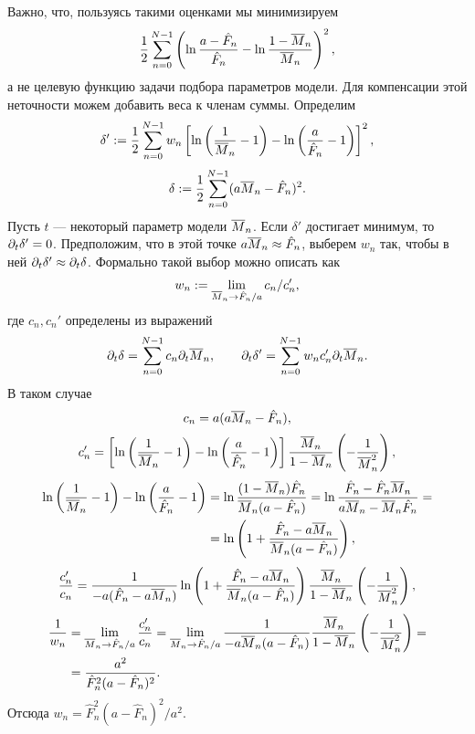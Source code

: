 Важно, что, пользуясь такими оценками мы минимизируем
\[
  \frac{1}{2}\sum_{n=0}^{N-1}\left(\ln \frac{a-\hat F_{n}}{\hat F_{n}}-
  \ln\frac{1-\overline{M}_{n}}{\overline{M}_{n}}
  \right)^{2},
\]
а не целевую функцию задачи подбора параметров модели. Для компенсации этой
неточности можем добавить веса к членам суммы. Определим
\[
  \delta':=\frac{1}{2}\sum_{n=0}^{N-1}w_{n}
  \left[
    \ln \left(\frac{1}{\overline{M}_{n}}-1\right)-
    \ln \left(\frac{a}{\hat F_{n}}-1\right)
    \right]^{2},
\]
\[
  \delta:=\frac{1}{2}\sum_{n=0}^{N-1}(a\overline{M}_{n}-\hat F_{n})^{2}.
\]
Пусть $t$ --- некоторый параметр модели $\overline{M}_{n}$. Если $\delta'$ достигает
минимум, то $\partial_{t}\delta'=0$. Предположим, что в этой точке
$a\overline{M}_{n}\approx\hat F_{n}$, выберем $w_{n}$ так, чтобы в ней
$\partial_{t}\delta'\approx\partial_{t}\delta$. Формально такой выбор можно описать как
\[
  w_{n}:=\lim_{\overline{M}_{n}\to \hat F_{n}/a}c_{n}/c'_{n},
\]
где $c_{n},c_{n}'$ определены из выражений
\[
  \partial_{t}\delta = \sum_{n=0}^{N-1}c_{n}\partial_{t}\overline{M}_{n},\qquad
  \partial_{t}\delta' = \sum_{n=0}^{N-1}w_{n}c'_{n}\partial_{t}\overline{M}_{n}.
\]
В таком случае
\[
  c_{n}=a(a\overline{M}_{n}-\hat F_{n}),
\]
\[
  c'_{n}=\left[
    \ln \left(\frac{1}{\overline{M}_{n}}-1\right)-
    \ln \left(\frac{a}{\hat F_{n}}-1\right)
    \right]\frac{\overline{M}_{n}}{1-\overline{M}_{n}}\left(-\frac{1}{\overline{M}_{n}^{2}}\right),
\]
\[
  \begin{aligned}
    \ln \left(\frac{1}{\overline{M}_{n}}-1\right)-
    \ln \left(\frac{a}{\hat F_{n}}-1\right)
     & =
    \ln
    \frac{(1-\overline{M}_{n})\hat F_{n}}{\overline{M}_{n}(a-\hat F_{n})}=
    \ln\frac{\hat F_{n}-\hat F_{n}\overline{M}_{n}}{a\overline{M}_{n}-\overline{M}_{n}\hat F_{n}}=  \\
     & =\ln\left(1+\frac{\hat F_{n}-a\overline{M}_{n}}{\overline{M}_{n}(a-\hat F_{n})}\right),
  \end{aligned}
\]
\[
  \frac{c'_{n}}{c_{n}}=\frac{1}{-a(\hat F_{n}-a\overline{M}_{n})}
  \ln\left(1+\frac{\hat F_{n}-a\overline{M}_{n}}{\overline{M}_{n}(a-\hat F_{n})}\right)
  \frac{\overline{M}_{n}}{1-\overline{M}_{n}}\left(-\frac{1}{\overline{M}_{n}^{2}}\right),
\]
\[
  \begin{aligned}
    \frac{1}{w_{n}}
     & =\lim_{\overline{M}_{n}\to\hat F_{n}/a}\frac{c'_{n}}{c_{n}}=
    \lim_{\overline{M}_{n}\to\hat F_{n}/a}
    \frac{1}{-a\overline{M}_{n}(a-\hat F_{n})}\frac{\overline{M}_{n}}{1-\overline{M}_{n}}
    \left(-\frac{1}{\overline{M}_{n}^{2}}\right)=                   \\
     & =\frac{a^{2}}{\hat F_{n}^{2}(a-\hat F_{n})^{2}}.
  \end{aligned}
\]
Отсюда $w_{n}=\hat F_{n}^{2}(a-\hat F_{n})^{2}/a^{2}$.

